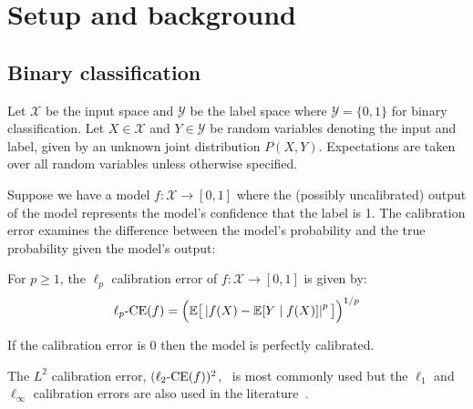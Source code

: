 \section{Setup and background}
\label{sec:formulation}

\newcommand{\lpce}[0]{\ensuremath{\ell_p\textup{-CE}}}
\newcommand{\ltwoce}[0]{\ensuremath{\ell_2\textup{-CE}}}
\newcommand{\lsquared}[0]{\ensuremath{L^2}}
\newcommand{\squaredce}[0]{\ensuremath{L^2\textup{-CE}}}
\newcommand{\topsquaredce}[0]{\ensuremath{L^2\textup{-TCE}}}
\newcommand{\margsquaredce}[0]{\ensuremath{L^2\textup{-MCE}}}
\newcommand{\mse}[0]{\ensuremath{\textup{MSE}}}

\subsection{Binary classification}

Let $\mathcal{X}$ be the input space and $\mathcal{Y}$ be the label space where $\mathcal{Y} = \{0, 1\}$ for binary classification.
Let $X \in \mathcal{X}$ and $Y \in \mathcal{Y}$ be random variables denoting the input and label, given by an unknown joint distribution  $P(X, Y)$. Expectations are taken over all random variables unless otherwise specified.

Suppose we have a model $f : \mathcal{X} \to [0, 1]$ where the (possibly uncalibrated) output of the model represents the model's confidence that the label is 1. The calibration error examines the difference between the model's probability and the true probability given the model's output:

\begin{definition}
For $p \geq 1$, the $\ell_p$ calibration error of $f : \mathcal{X} \to [0, 1]$ is given by:
\begin{align}
\lpce(f) = \Big(\expect\big[ \left|f(X) - \expect[Y \mid f(X)] \right|^p \big] \Big)^{1/p}
\end{align}
\end{definition}

If the calibration error is $0$ then the model is perfectly calibrated.



The $\lsquared$ calibration error, $(\ltwoce(f))^2$,~\cite{murphy1973vector,murphy1977reliability,degroot1983forecasters, nguyen2015posterior, hendrycks2019anomaly, kuleshov2015calibrated, hendrycks2019pretraining, brocker2012empirical} is most commonly used but the $\ell_1$ and $\ell_{\infty}$ calibration errors are also used in the literature~\cite{guo2017calibration, naeini2015obtaining, nixon2019calibration}.

